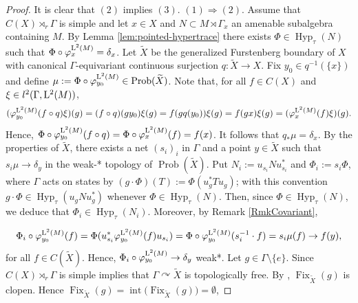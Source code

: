 \documentclass[12pt]{amsart} %
\theoremstyle{plain}
\theoremstyle{definition}
\DeclareMathOperator{\Prob}{Prob}
\begin{document}
\begin{proof}
It is clear that $(2)$ implies $(3)$.
\medskip
\noindent$(1)\Rightarrow(2)$. Assume that \(C(X)\rtimes_{r}\Gamma\) is simple and let $x\in X$ and $N\subset M\rtimes\Gamma_x$ an amenable subalgebra containing $M$. By Lemma \ref{lem:pointed-hypertrace} there exists $\Phi\in\operatorname{Hyp}_\tau(N)$
such that $\Phi\circ\varphi_x^{{\rm L}^2(M)}=\delta_x$. Let $\widetilde{X}$ be the generalized Furstenberg boundary of $X$ with canonical $\Gamma$-equivariant continuous surjection $q:\widetilde{X}\to X$. Fix $y_0\in q^{-1}(\{x\})$ and define $\mu:=\Phi\circ\varphi_{y_0}^{{\rm L}^2(M)}\in\Prob(\widetilde{X})$. Note that, for all $f\in C(X)$ and $\xi\in l^2(\Gamma,{\rm L}^2(M))$,
$$(\varphi_{y_0}^{{\rm L}^2(M)}(f\circ q)\xi)(g)=(f\circ q)(gy_0)\xi(g)=f(gq(y_0))\xi(g)=f(gx)\xi(g)=(\varphi_x^{{\rm L}^2(M)}(f)\xi)(g).$$
Hence, $\Phi\circ\varphi_{y_0}^{{\rm L}^2(M)}(f\circ q)=\Phi\circ\varphi_{x}^{{\rm L}^2(M)}(f)=f(x)$. It follows that $q_*\mu=\delta_x$. By the properties of $\widetilde{X}$, there exists a net \((s_i)_i\) in \(\Gamma\) and
a point \(y\in \widetilde{X}\) such that $s_i\mu \to \delta_y$ in the weak-* topology of \(\operatorname{Prob}(\widetilde{X})\). Put $N_i:=u_{s_i}Nu_{s_i}^*$ and $\Phi_i:=s_i\Phi$, where $\Gamma$ acts on states by $(g\cdot\Phi)(T):=\Phi(u_g^*Tu_g)$; with this convention $g\cdot\Phi\in\operatorname{Hyp}_\tau(u_gNu_g^*)$ whenever $\Phi\in\operatorname{Hyp}_\tau(N)$. Then, since $\Phi\in\operatorname{Hyp}_{\tau}(N)$, we deduce that \(\Phi_i\in \operatorname{Hyp}_{\tau}(N_i)\). Moreover, by Remark \ref{RmkCovariant},

$$\Phi_i\circ\varphi_{y_0}^{{\rm L}^2(M)}(f)=\Phi(u_{s_i}^*\varphi_{y_0}^{{\rm L}^2(M)}(f)u_{s_i})=\Phi\circ\varphi_{y_0}^{{\rm L}^2(M)}(s_i^{-1}\cdot f)=s_i\mu(f)\to f(y),$$
for all $f\in C(\widetilde{X})$. Hence, $\Phi_i\circ\varphi_{y_0}^{{\rm L}^2(M)}\to\delta_y$ weak*.
\medskip
\noindent Let \(g\in\Gamma\setminus\{e\}\).
Since
$C(X)\rtimes_r\Gamma$ is simple \cite[Theorem~3.4]{kawabe2017uniformly} implies that
$\Gamma\curvearrowright\widetilde X$ is topologically free.  By
\cite[Proposition~3.3(i)]{kawabe2017uniformly}, $\operatorname{Fix}_{\widetilde
X}(g)$ is clopen.  Hence $\operatorname{Fix}_{\widetilde X}(g)=\operatorname{int}\bigl(\operatorname{Fix}_{\widetilde X}(g)\bigr)=\emptyset$,

\end{proof}
\end{document}
